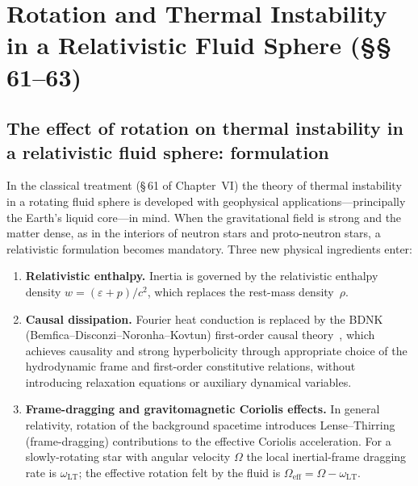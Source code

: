 
\chapter*{Rotation and Thermal Instability in a Relativistic Fluid Sphere (\S\S\,61--63)}
\label{ch:rel-6-rot}

\section{The effect of rotation on thermal instability in a
relativistic fluid sphere: formulation}\label{sec:rel-61}

In the classical treatment (\S\,61 of Chapter~VI) the theory of
thermal instability in a rotating fluid sphere is developed with
geophysical applications---principally the Earth's liquid core---in
mind.  When the gravitational field is strong and the matter dense,
as in the interiors of neutron stars and proto-neutron stars, a
relativistic formulation becomes mandatory.  Three new physical
ingredients enter:
\begin{enumerate}
\item \textbf{Relativistic enthalpy.}  Inertia is governed by the
  relativistic enthalpy density $w = (\varepsilon + p)/c^{2}$, which
  replaces the rest-mass density~$\rho$.
\item \textbf{Causal dissipation.}  Fourier heat conduction is
  replaced by the BDNK (Bemfica--Disconzi--Noronha--Kovtun) first-order
  causal theory~\cite{BemficaDN2018,Kovtun2019,BemficaDN2019}, which
  achieves causality and strong hyperbolicity through appropriate
  choice of the hydrodynamic frame and first-order constitutive
  relations, without introducing relaxation equations or auxiliary
  dynamical variables.
\item \textbf{Frame-dragging and gravitomagnetic Coriolis effects.}
  In general relativity, rotation of the background spacetime
  introduces Lense--Thirring (frame-dragging) contributions to the
  effective Coriolis acceleration.  For a slowly-rotating star with
  angular velocity $\Omega$ the local inertial-frame dragging rate is
  $\omega_{\mathrm{LT}}$; the effective rotation felt by the fluid is
  $\Omega_{\mathrm{eff}} = \Omega - \omega_{\mathrm{LT}}$.
\end{enumerate}

